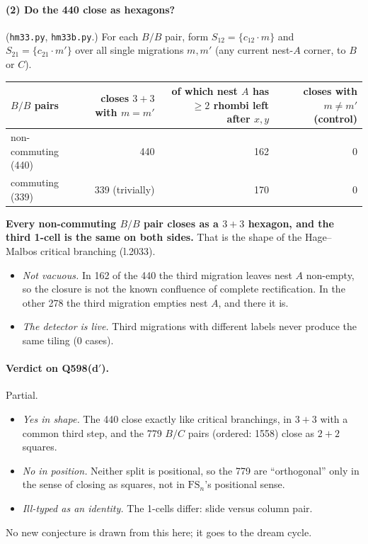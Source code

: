 \documentclass[11pt]{article}
\theoremstyle{definition}\newtheorem{definition}[theorem]{Definition}\newtheorem{remark}[theorem]{Remark}
\begin{document}
\paragraph{(2) Do the 440 close as hexagons?} (\texttt{hm33.py}, \texttt{hm33b.py}.) For each $B/B$ pair, form $S_{12}=\{c_{12}\cdot m\}$ and $S_{21}=\{c_{21}\cdot m'\}$ over all single migrations $m,m'$ (any current nest-$A$ corner, to $B$ or $C$).
\begin{center}\begin{tabular}{lrrr}\toprule
$B/B$ pairs & closes $3+3$ with $m=m'$ & of which nest $A$ has $\ge2$ rhombi left after $x,y$ & closes with $m\neq m'$ (control)\\\midrule
non-commuting (440) & 440 & 162 & 0\\
commuting (339) & 339 (trivially) & 170 & 0\\\bottomrule
\end{tabular}\end{center}
\textbf{Every non-commuting $B/B$ pair closes as a $3+3$ hexagon, and the third 1-cell is the same on both sides.} That is the shape of the Hage--Malbos critical branching (l.2033).
\begin{itemize}
\item \emph{Not vacuous.} In 162 of the 440 the third migration leaves nest $A$ non-empty, so the closure is not the known confluence of complete rectification. In the other 278 the third migration empties nest $A$, and there it is.
\item \emph{The detector is live.} Third migrations with different labels never produce the same tiling (0 cases).
\end{itemize}

\paragraph{Verdict on Q598(d$'$).} Partial.
\begin{itemize}
\item \emph{Yes in shape.} The 440 close exactly like critical branchings, in $3+3$ with a common third step, and the 779 $B/C$ pairs (ordered: 1558) close as $2+2$ squares.
\item \emph{No in position.} Neither split is positional, so the 779 are ``orthogonal'' only in the sense of closing as squares, not in $\mathrm{FS}_n$'s positional sense.
\item \emph{Ill-typed as an identity.} The 1-cells differ: slide versus column pair.
\end{itemize}
No new conjecture is drawn from this here; it goes to the dream cycle.
\end{document}
